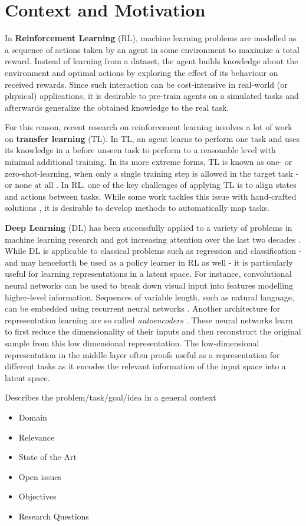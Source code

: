 \section{Context and Motivation}
\label{sec:context}

In \textbf{Reinforcement Learning} (RL), machine learning problems are modelled as a sequence of actions taken by an agent in some environment to maximize a total reward. Instead of learning from a dataset, the agent builds knowledge about the environment and optimal actions by exploring the effect of its behaviour on received rewards. Since such interaction can be cost-intensive in real-world (or physical) applications, it is desirable to pre-train agents on a simulated tasks and afterwards generalize the obtained knowledge to the real task. 

For this reason, recent research on reinforcement learning involves a lot of work on \textbf{transfer learning} (TL). In TL, an agent learns to perform one task and uses its knowledge in a before unseen task to perform to a reasonable level with minimal additional training. In its more extreme forms, TL is known as one- or zero-shot-learning, when only a single training step is allowed in the target task - or none at all \citep{goodfellow2016deep}. In RL, one of the key challenges of applying TL is to align states and actions between tasks. While some work tackles this issue with hand-crafted solutions \citep[e.g.][]{taylor2007cross}, it is desirable to develop methods to automatically map tasks.


\textbf{Deep Learning} (DL) has been successfully applied to a variety of problems in machine learning research and got increasing attention over the last two decades \citep{goodfellow2016deep}. While DL is applicable to classical problems such as regression and classification - and may henceforth be used as a policy learner in RL as well - it is particularly useful for learning representations in a latent space. For instance, convolutional neural networks can be used to break down visual input into features modelling higher-level information. Sequences of variable length, such as natural language, can be embedded using recurrent neural networks \citep{goldberg2017neural}. Another architecture for representation learning are so called \textit{autoencoders} \citep{hinton2006reducing}. These neural networks learn to first reduce the dimensionality of their inputs and then reconstruct the original sample from this low dimensional representation. The low-dimensional representation in the middle layer often proofs useful as a representation for different tasks as it encodes the relevant information of the input space into a latent space.


\hrulefill

Describes the problem/task/goal/idea in a general context

\begin{itemize}
\item Domain
\item Relevance
\item State of the Art
\item Open issues
\item Objectives
\item Research Questions
\end{itemize}